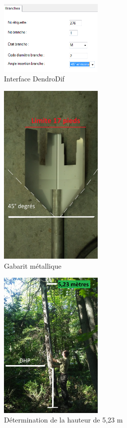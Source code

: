 \documentclass[letterpaper, 12pt]{article}
\begin{document}
\begin{onehalfspace}
\begin{figure}[H]
	\centering
	\includegraphics[width=5cm]{Figure3}
	\caption{Interface DendroDif}
\end{figure}

\begin{figure}[H]
	\centering
	\includegraphics[width=5cm]{Figure4}
	\caption{Gabarit métallique}
\end{figure}

\begin{figure}[H]
	\centering
	\includegraphics[width=5cm]{Figure5}
	\caption{Détermination de la hauteur de 5,23 m}
\end{figure}


\end{onehalfspace}
\end{document}
